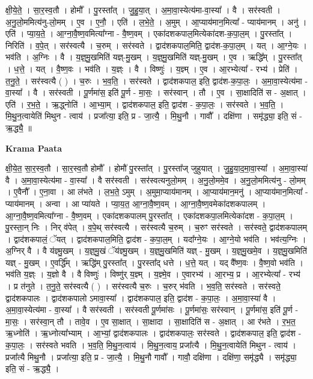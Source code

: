 \documentclass[17pt]{extarticle}
\begin{document}
क्षी॒ये॒ते॒ । सा॒र॒स्व॒तौ । होमौ᳚ । पु॒रस्ता᳚त् । जु॒हु॒या॒त् । अ॒मा॒वा॒स्येत्य॑मा-वा॒स्या᳚ । वै । सर॑स्वती । अ॒नु॒लो॒ममित्य॑नु-लो॒मम् । ए॒व । ए॒नौ॒ । एति॑ । ल॒भे॒ते॒ । अ॒मुम् । आ॒प्याय॑मान॒मित्या᳚ - प्याय॑मानम् । अनु॑ । एति॑ । प्या॒य॒ते॒ । आ॒ग्ना॒वै॒ष्ण॒वमित्या᳚ग्ना - वै॒ष्ण॒वम् । एका॑दशकपाल॒मित्येका॑दश-क॒पा॒ल॒म् । पु॒रस्ता᳚त् । निरिति॑ । व॒पे॒त् । सर॑स्वत्यै । च॒रुम् । सर॑स्वते । द्वाद॑शकपाल॒मिति॒ द्वाद॑श-क॒पा॒ल॒म् । यत् । आ॒ग्ने॒यः । भव॑ति । अ॒ग्निः । वै । य॒ज्ञ्॒मु॒खमिति॑ यज्ञ्-मु॒खम् । य॒ज्ञ्॒मु॒खमिति॑ यज्ञ्-मु॒खम् । ए॒व । ऋद्धि᳚म् । पु॒रस्ता᳚त् । ध॒त्ते॒ । यत् । वै॒ष्ण॒वः । भव॑ति । य॒ज्ञ्ः । वै । विष्णुः॑ । य॒ज्ञ्म् । ए॒व । आ॒रभ्येत्या᳚ - रभ्य॑ । प्रेति॑ । त॒नु॒ते॒ । सर॑स्वत्यै ( ) । च॒रुः । भ॒व॒ति॒ । सर॑स्वते । द्वाद॑शकपाल॒ इति॒ द्वाद॑श-क॒पा॒लः॒ । अ॒मा॒वा॒स्येत्य॑मा - वा॒स्या᳚ । वै । सर॑स्वती । पू॒र्णमा॑स॒ इति॑ पू॒र्ण - मा॒सः॒ । सर॑स्वान् । तौ । ए॒व । सा॒क्षादिति॑ स - अ॒क्षात् । एति॑ । र॒भ॒ते॒ । ऋ॒द्ध्नोति॑ । आ॒भ्या॒म् । द्वाद॑शकपाल॒ इति॒ द्वाद॑श - क॒पा॒लः॒ । सर॑स्वते । भ॒व॒ति॒ । मि॒थु॒न॒त्वायेति॑ मिथुन - त्वाय॑ । प्रजा᳚त्या॒ इति॒ प्र - जा॒त्यै॒ । मि॒थु॒नौ । गावौ᳚ । दक्षि॑णा । समृ॑द्ध्या॒ इति॒ सं - ऋ॒द्ध्यै॒ ॥  \newline


\textbf{Krama Paata} \newline

क्षी॒ये॒त॒ सा॒र॒स्व॒तौ । सा॒र॒स्व॒तौ होमौ᳚ । होमौ॑ पु॒रस्ता᳚त् । पु॒रस्ता᳚ज् जुहुयात् । जु॒हु॒या॒द॒मा॒वा॒स्या᳚ । अ॒मा॒वा॒स्या॑ वै । अ॒मा॒वा॒स्येत्य॑मा - वा॒स्या᳚ । वै सर॑स्वती । सर॑स्वत्यनुलो॒मम् । अ॒नु॒लो॒ममे॒व । अ॒नु॒लो॒ममित्य॑नु - लो॒मम् । ए॒वैनौ᳚ । ए॒ना॒वा । आ ल॑भते । ल॒भ॒ते॒ ऽमुम् । अ॒मुमा॒प्याय॑मानम् । आ॒प्याय॑मान॒मनु॑ । आ॒प्याय॑मान॒मित्या᳚ - प्याय॑मानम् । अन्वा । आ प्या॑यते । प्या॒य॒त॒ आ॒ग्ना॒वै॒ष्ण॒वम् । आ॒ग्ना॒वै॒ष्ण॒वमेका॑दशकपालम् । आ॒ग्ना॒वै॒ष्ण॒वमित्या᳚ग्ना - वै॒ष्ण॒वम् । एका॑दशकपालम् पु॒रस्ता᳚त् । एका॑दशकपा॒लमित्येका॑दश - क॒पा॒ल॒म् । पु॒रस्ता॒न् निः । निर् व॑पेत् । व॒पे॒थ् सर॑स्वत्यै । सर॑स्वत्यै च॒रुम् । च॒रुꣳ सर॑स्वते । सर॑स्वते॒ द्वाद॑शकपालम् । द्वाद॑शकपालं॒ ॅयत् । द्वाद॑शकपाल॒मिति॒ द्वाद॑श - क॒पा॒ल॒म् । यदा᳚ग्ने॒यः । आ॒ग्ने॒यो भव॑ति । भव॑त्य॒ग्निः । अ॒ग्निर् वै । वै य॑ज्ञ्मु॒खम् । य॒ज्ञ्॒मु॒खं ॅय॑ज्ञ्मु॒खम् । य॒ज्ञ्॒मु॒खमिति॑ यज्ञ् - मु॒खम् । य॒ज्ञ्॒मु॒खमे॒व । य॒ज्ञ्॒मु॒खमिति॑ यज्ञ् - मु॒खम् । ए॒वर्द्धि᳚म् । ऋद्धि॑म् पु॒रस्ता᳚त् । पु॒रस्ता᳚द् धत्ते । ध॒त्ते॒ यत् । यद् वै᳚ष्ण॒वः । वै॒ष्ण॒वो भव॑ति । भव॑ति य॒ज्ञ्ः । य॒ज्ञो वै । वै विष्णुः॑ । विष्णु॑र् य॒ज्ञ्म् । य॒ज्ञ्मे॒व । ए॒वारभ्य॑ । आ॒रभ्य॒ प्र । आ॒रभ्येत्या᳚ - रभ्य॑ । प्र त॑नुते । त॒नु॒ते॒ सर॑स्वत्यै ( ) । सर॑स्वत्यै च॒रुः । च॒रुर् भ॑वति । भ॒व॒ति॒ सर॑स्वते । सर॑स्वते॒ द्वाद॑शकपालः । द्वाद॑शकपालो ऽमावा॒स्या᳚ । द्वाद॑शकपाल॒ इति॒ द्वाद॑श - क॒पा॒लः॒ । अ॒मा॒वा॒स्या॑ वै । अ॒मा॒वा॒स्येत्य॑मा - वा॒स्या᳚ । वै सर॑स्वती । सर॑स्वती पू॒र्णमा॑सः । पू॒र्णमा॑सः॒ सर॑स्वान् । पू॒र्णमा॑स॒ इति॑ पू॒र्ण - मा॒सः॒ । सर॑स्वा॒न् तौ । तावे॒व । ए॒व सा॒क्षात् । सा॒क्षादा । सा॒क्षादिति॑ स - अ॒क्षात् । आ र॑भते । र॒भ॒त॒ ऋ॒ध्नोति॑ । ऋ॒ध्नोत्या᳚भ्याम् । आ॒भ्यां॒ द्वाद॑शकपालः । द्वाद॑शकपालः॒ सर॑स्वते । द्वाद॑शकपाल॒ इति॒ द्वाद॑श - क॒पा॒लः॒ । सर॑स्वते भवति । भ॒व॒ति॒ मि॒थु॒न॒त्वाय॑ । मि॒थु॒न॒त्वाय॒ प्रजा᳚त्यै । मि॒थु॒न॒त्वायेति॑ मिथुन - त्वाय॑ । प्रजा᳚त्यै मिथु॒नौ । प्रजा᳚त्या॒ इति॒ प्र - जा॒त्यै॒ । मि॒थु॒नौ गावौ᳚ । गावौ॒ दक्षि॑णा । दक्षि॑णा॒ समृ॑द्ध्यै । समृ॑द्ध्या॒ इति॒ सं - ऋ॒द्ध्यै॒ । \newline
\end{document}
